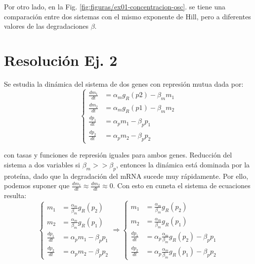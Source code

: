 \documentclass[twocolumn,aps,prl]{revtex4-1}
\newcommand*\sepline{%
  \begin{center} 
    \rule[1ex]{.5\textwidth}{.5pt}
  \end{center}}
\begin{document}
Por otro lado, en la Fig. \ref{fig:figuras/ex01-concentracion-osc}. se tiene una comparación entre dos sistemas con el mismo exponente de Hill, pero a diferentes valores de las degradaciones $\beta$.


\section{Resolución Ej. 2}


Se estudia la dinámica del sistema de dos genes con represión mutua dada por:
$$\left\lbrace
\begin{aligned}
\frac{d m_{1}}{dt} &= \alpha_{m} g_{R}(p 2)-\beta_{m} m_{1} \\
\frac{d m_{2}}{dt} &= \alpha_{m} g_{R}(p 1)-\beta_{m} m_{2} \\
\frac{d p_{1}}{dt} &= \alpha_{p} m_{1}-\beta_{p} p_{1} \\
\frac{d p_{2}}{dt} &= \alpha_{p} m_{2}-\beta_{p} p_{2}
\end{aligned}\right.
$$

con tasas y funciones de represión iguales para ambos genes.
Reducción del sistema a dos variables
si $\beta_{m}>>\beta_{p}$, entonces la dinámica está 
dominada por la proteína, dado que la degradación del mRNA 
sucede muy rápidamente. Por ello, podemos suponer que 
$\frac{dm_1}{dt} \approx \frac{dm_2}{dt} \approx 0$. 
Con esto en cuneta el sistema de ecuaciones resulta:
$$
\left\lbrace
\begin{aligned}
  m_{1} &=\frac{\alpha_{m}}{\beta_{m}} g_{R}\left(p_{2}\right) \\
  m_{2} &=\frac{\alpha_{m}}{\beta_{m}} g_{R}\left(p_{1}\right) \\
  \frac{dp_{1}}{dt} &= \alpha_{p} m_{1}-\beta_{p} p_{1} \\
  \frac{dp_{2}}{dt} &= \alpha_{p} m_{2}-\beta_{p} p_{2}
\end{aligned}\right.
\Rightarrow
\left\lbrace
\begin{aligned}
  m_{1} &=\frac{\alpha_{m}}{\beta_{m}} g_{R}\left(p_{2}\right) \\
  m_{2} &=\frac{\alpha_{m}}{\beta_{m}} g_{R}\left(p_{1}\right) \\
  \frac{dp_{1}}{dt} &=\alpha_{p} \frac{\alpha_{m}}{\beta_{m}} g_{R}\left(p_{2}\right)-\beta_{p} p_{1} \\
  \frac{dp_{2}}{dt} &=\alpha_{p} \frac{\alpha_{m}}{\beta_{m}} g_{R}\left(p_{1}\right)-\beta_{p} p_{2}
\end{aligned}\right.
$$
\end{document}
